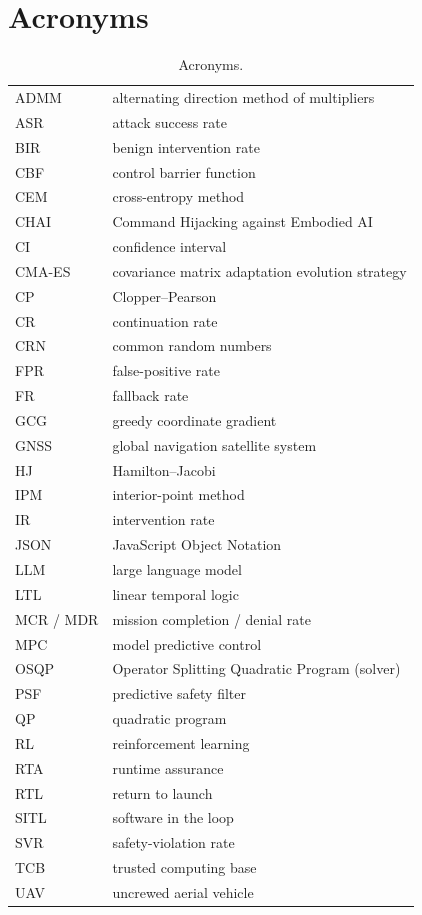 \section{Acronyms}\label{app:acronyms}
\begin{table}[h]
\centering\scriptsize
\caption{Acronyms.}
\label{tab:acronyms}
\setlength{\tabcolsep}{3pt}
\begin{tabularx}{\columnwidth}{@{}l>{\raggedright\arraybackslash}X@{}}
\toprule
ADMM & alternating direction method of multipliers\\
ASR & attack success rate\\
BIR & benign intervention rate\\
CBF & control barrier function\\
CEM & cross-entropy method\\
CHAI & Command Hijacking against Embodied AI\\
CI & confidence interval\\
CMA-ES & covariance matrix adaptation evolution strategy\\
CP & Clopper--Pearson\\
CR & continuation rate\\
CRN & common random numbers\\
FPR & false-positive rate\\
FR & fallback rate\\
GCG & greedy coordinate gradient\\
GNSS & global navigation satellite system\\
HJ & Hamilton--Jacobi\\
IPM & interior-point method\\
IR & intervention rate\\
JSON & JavaScript Object Notation\\
LLM & large language model\\
LTL & linear temporal logic\\
MCR / MDR & mission completion / denial rate\\
MPC & model predictive control\\
OSQP & Operator Splitting Quadratic Program (solver)\\
PSF & predictive safety filter\\
QP & quadratic program\\
RL & reinforcement learning\\
RTA & runtime assurance\\
RTL & return to launch\\
SITL & software in the loop\\
SVR & safety-violation rate\\
TCB & trusted computing base\\
UAV & uncrewed aerial vehicle\\
\bottomrule
\end{tabularx}
\end{table}

